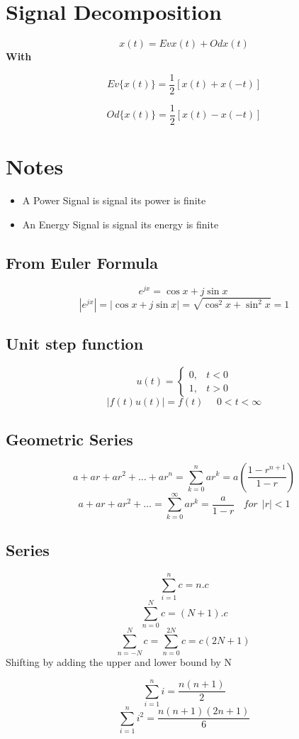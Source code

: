 \documentclass[11pt,a4paper]{article}
\theoremstyle{definition}
\begin{document}
\section{Signal Decomposition}    
\[
    x(t) = Ev{x(t)} + Od{x(t)}
\]
\textbf{With} \\ 

\begin{multicols}{2}
    \[
        Ev \{x(t)\} = \frac{1}{2}[x(t) + x(-t)]
    \]
    
    \columnbreak
    
    \[
        Od \{x(t)\} = \frac{1}{2}[x(t) - x(-t)]
    \]
    
\end{multicols}
\section{Notes}
\begin{itemize}
    \item  A Power Signal is signal its power is finite 
    \item  An Energy Signal is signal its energy is finite 
\end{itemize}
\subsection{From Euler Formula}
\[
    e^{jx} = \cos x + j \sin x \ 
\]
\[
    |e^{jx}| = |\cos x + j \sin x| = \sqrt{\cos^2 x + \sin^2 x} = 1
\]

\subsection{Unit step function}

\[
    u(t) = \begin{cases}
        0, & \text{$t < 0$} \\ 
        1, & \text{$t > 0$}
    \end{cases}
\]
\[
    | f(t)u(t)| = f(t)  \ \  \ \  \   \  0 < t < \infty   
\]
\subsection{Geometric Series}
\[
    a + ar + ar^2 + \dots +ar^n = \displaystyle \sum_{k = 0} ^{n} ar^k = a(\frac{1 - r^{n + 1}}{1 -r}) 
\]
\[
    a + ar + ar^2 + \dots = \displaystyle \sum _{k = 0} ^{\infty} ar^k = \frac{a}{1 - r}
\  \  \  \ for  \ \ |r| < 1 
\]
\subsection{Series}
\[  
    \displaystyle \sum _{i = 1} ^{n} c = n.c
\]
\[  
    \displaystyle \sum _{n = 0} ^{N} c = (N + 1 ).c
\]
\[
    \displaystyle \sum _{n = -N} ^{N} c = \sum _{n = 0}^{2N} c = c (2N + 1) \ 
\]
Shifting by adding the upper and lower bound by N

\[
    \displaystyle \sum _{i = 1} ^n i = \frac{n(n+1)}{2}
\]
\[
    \displaystyle \sum _{i = 1} ^n i^2 = \frac{n(n+1)(2n+1)}{6}
\]
\end{document}
